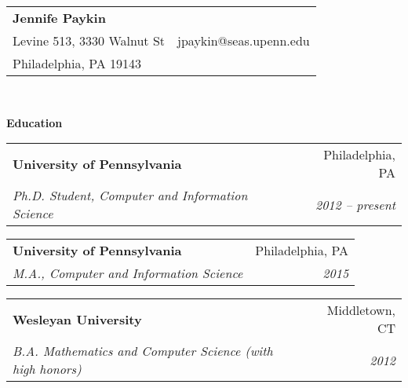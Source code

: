 \documentclass[letterpaper,11pt]{article}
\makeatletter
\newcommand{\resitem}[1]{\item #1 \vspace{-2pt}}
\newcommand{\resheading}[1]{{\large \colorbox{mygrey}{\begin{minipage}{\textwidth}{\textbf{#1 \vphantom{p\^{E}}}}\end{minipage}}}}
\newcommand{\ressubheading}[4]{
\begin{tabular*}{7in}{l@{\extracolsep{\fill}}r} 
		\textbf{#1} & #2 \\
		\textit{#3} & \textit{#4} \\
\end{tabular*}\vspace{-2pt}}
\makeatother
\begin{document}
\newcommand{\myheader}{
\begin{tabular*}{7in}{l@{\extracolsep{\fill}}r}
	\textbf{\LARGE Jennife Paykin}	    &  \\
        Levine 513, 3330 Walnut St          & jpaykin@seas.upenn.edu \\
        Philadelphia, PA 19143              & 
	\end{tabular*}
\\
\vspace{0.1in}}

\myheader


\resheading{Education}
        \ressubheading{University of Pennsylvania}{Philadelphia, PA}
            {Ph.D. Student, Computer and Information Science}
            {2012 -- present}
    \vspace{7pt}

        \ressubheading{University of Pennsylvania}{Philadelphia, PA}
            {M.A., Computer and Information Science}
            {2015}


    \vspace{7pt}
        \ressubheading{Wesleyan University}{Middletown, CT}
            {B.A. Mathematics and Computer Science (with high honors)}
            {2012}

    \vspace{5pt}


\end{document}
